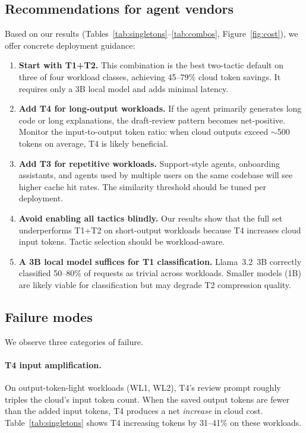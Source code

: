 \documentclass[11pt,a4paper]{article}
\begin{document}
\subsection{Recommendations for agent vendors}
\label{sec:recommendations}

Based on our results (Tables~\ref{tab:singletons}--\ref{tab:combos},
Figure~\ref{fig:cost}), we offer concrete deployment guidance:

\begin{enumerate}
  \item \textbf{Start with T1+T2.} This combination is the best
    two-tactic default on three of four workload classes, achieving
    45--79\% cloud token savings. It requires only a 3B local model
    and adds minimal latency.
  \item \textbf{Add T4 for long-output workloads.} If the agent
    primarily generates long code or long explanations, the
    draft-review pattern becomes net-positive. Monitor the
    input-to-output token ratio: when cloud outputs exceed
    $\sim$500 tokens on average, T4 is likely beneficial.
  \item \textbf{Add T3 for repetitive workloads.} Support-style
    agents, onboarding assistants, and agents used by multiple
    users on the same codebase will see higher cache hit rates.
    The similarity threshold should be tuned per deployment.
  \item \textbf{Avoid enabling all tactics blindly.} Our results
    show that the full set underperforms T1+T2 on short-output
    workloads because T4 increases cloud input tokens. Tactic
    selection should be workload-aware.
  \item \textbf{A 3B local model suffices for T1 classification.}
    Llama~3.2~3B correctly classified 50--80\% of requests as
    trivial across workloads. Smaller models (1B) are likely
    viable for classification but may degrade T2 compression quality.
\end{enumerate}

\subsection{Failure modes}
\label{sec:failures}

We observe three categories of failure.

\paragraph{T4 input amplification.}
On output-token-light workloads (WL1, WL2), T4's review prompt roughly
triples the cloud's input token count. When the saved output tokens are
fewer than the added input tokens, T4 produces a net \emph{increase} in
cloud cost. Table~\ref{tab:singletons} shows T4 increasing tokens by
31--41\% on these workloads.
\end{document}
